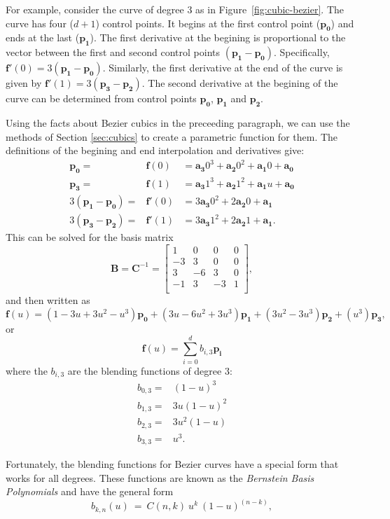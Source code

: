 For example, consider the \Bezier curve of degree 3 as in
Figure~\ref{fig:cubic-bezier}. The curve has four ($d+1$) control
points. It begins at the first control point ($\mathbf{p_0}$) and ends
at the last ($\mathbf{p_1}$). The first derivative at the begining is
proportional to the vector between the first and second control points
$(\mathbf{p_1}-\mathbf{p_0})$. Specifically,
$\mathbf{f'}(0)=3(\mathbf{p_1}-\mathbf{p_0})$. Similarly, the first
derivative at the end of the curve is given by
$\mathbf{f'}(1)=3(\mathbf{p_3}-\mathbf{p_2})$. The second derivative
at the begining of the curve can be determined from control points
$\mathbf{p_0}$, $\mathbf{p_1}$ and $\mathbf{p_2}$.

Using the facts about Bezier cubics in the preceeding paragraph, we
can use the methods of Section \ref{sec:cubics} to create a parametric
function for them. The definitions of the begining and end
interpolation and derivatives give:
\[
\begin{array}{rcl}
	 \mathbf{p_0} = & \mathbf{f}(0) &
		=   \mathbf{a_3} 0^3 + \mathbf{a_2} 0^2 + \mathbf{a_1} 0 + \mathbf{a_0}\\
	 \mathbf{p_3} = & \mathbf{f}(1)&
		=   \mathbf{a_3} 1^3 + \mathbf{a_2} 1^2 + \mathbf{a_1} u + \mathbf{a_0} \\
	 3(\mathbf{p_1}-\mathbf{p_0}) = & \mathbf{f'}(0) &
		= 3 \mathbf{a_3} 0^2 + 2 \mathbf{a_2} 0 + \mathbf{a_1}     \\
	 3(\mathbf{p_3}-\mathbf{p_2}) =&  \mathbf{f'}(1) &
		= 3 \mathbf{a_3} 1^2 + 2 \mathbf{a_2} 1 + \mathbf{a_1}.
\end{array}
\]
This can be solved for the basis matrix
\[
	\mathbf{B} = \mathbf{C}^{-1} =
	\left[\begin{array}{rrrr}
	 1&  0&  0& 0\\
	-3&  3&  0& 0\\
	 3& -6&  3& 0\\
	-1&  3& -3& 1\\
	\end{array}\right],
\]
   and then written as
\[
       \mathbf{f}(u) = (1-3u+3u^2-u^3) \mathbf{p_0}
		     + (3u-6u^2+3u^3) \mathbf{p_1}
		     + (3u^2-3u^3) \mathbf{p_2}
		     + (u^3) \mathbf{p_3},
\]
   or
\[
       \mathbf{f}(u) = \displaystyle\sum_{i=0}^{d} b_{i,3}\mathbf{p_i}
\]
where the $b_{i,3}$ are the \Bezier blending functions of degree 3:
\[
	\begin{array}{rl}
       b_{0,3} = & (1-u)^3 \\
       b_{1,3} = & 3u(1-u)^2\\
       b_{2,3} = & 3u^2(1-u)\\
       b_{3,3} = & u^3.
	\end{array}
\]

Fortunately, the blending functions for Bezier curves have a special
form that works for all degrees. These functions are known as the
{\em Bernstein Basis Polynomials} and have the general form
\[
b_{k,n}(u)\ =\ C(n,k)\ u^k\ (1-u)^{(n-k)},
\]
